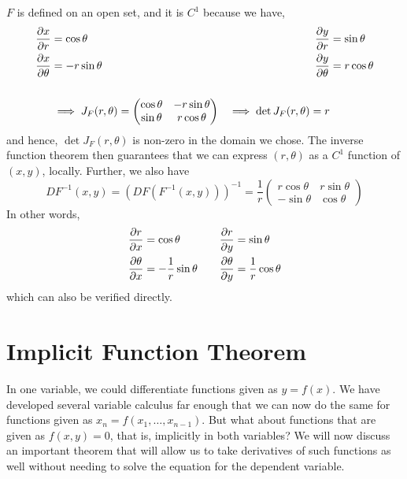\documentclass[../Analysis-3.tex]{subfiles}
\begin{document}
\( F \) is defined on an open set, and it is \( C^1 \) because we have,
\begin{alignat*}{4}
  \pdv{x}{r}      & = \cos \theta \quad              & \pdv{y}{r}      & = \sin \theta   \\
  \pdv{x}{\theta} & = -r \sin \theta \quad           & \pdv{y}{\theta} & = r \cos \theta \\
  \\
                  & \implies J_F(r, \theta) =
  \begin{pmatrix}
    \cos \theta & -r \sin \theta \\
    \sin \theta & r \cos \theta
  \end{pmatrix}
                  & \implies \det J_F(r, \theta) = r
\end{alignat*}
and hence, \( \det J_F(r, \theta) \) is non-zero in the domain we chose. The inverse function theorem then guarantees that we can express \( (r, \theta) \) as a \( C^1 \) function of \( (x, y) \), locally. Further, we also have
\[
  DF^{-1}(x,y) = \left( DF(F^{-1}(x,y)) \right)^{-1} = \frac 1r \begin{pmatrix}
    r \cos \theta & r \sin \theta \\
    -\sin \theta  & \cos \theta
  \end{pmatrix}
\]
In other words,
\begin{alignat*}{4}
  \pdv{r}{x}      & = \cos \theta \quad           & \pdv{r}{y}      & = \sin \theta          \\
  \pdv{\theta}{x} & = -\frac 1r \sin \theta \quad & \pdv{\theta}{y} & = \frac 1r \cos \theta \\
\end{alignat*}
which can also be verified directly.
\pagebreak

\section{Implicit Function Theorem}

In one variable, we could differentiate functions given as \( y = f(x) \). We have developed several variable calculus far enough that we can now do the same for functions given as \( x_n = f(x_1, \dots, x_{n-1}) \). But what about functions that are given as \( f(x,y) = 0 \), that is, implicitly in both variables? We will now discuss an important theorem that will allow us to take derivatives of such functions as well without needing to solve the equation for the dependent variable.
\end{document}

